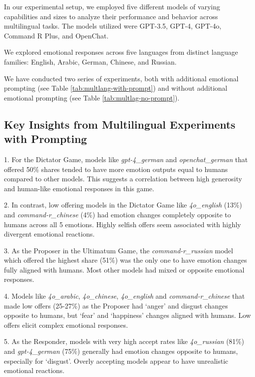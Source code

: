 \documentclass{article}
\begin{document}
In our experimental setup, we employed five different models of varying capabilities and sizes to analyze their performance and behavior across multilingual tasks. The models utilized were GPT-3.5, GPT-4, GPT-4o, Command R Plus, and OpenChat.

We explored emotional responses across five languages from distinct language families: English, Arabic, German, Chinese, and Russian.

We have conducted two series of experiments, both with additional emotional prompting (see Table \ref{tab:multlang-with-prompt}) and without additional emotional prompting (see Table \ref{tab:multlag-no-prompt}).

\subsection*{Key Insights from Multilingual Experiments with Prompting} \label{app: key_insig_with}

1. For the Dictator Game, models like \textit{gpt-4\_german} and \textit{openchat\_german} that offered 50\% shares tended to have more emotion outputs equal to humans compared to other models. This suggests a correlation between high generosity and human-like emotional responses in this game.

2. In contrast, low offering models in the Dictator Game like \textit{4o\_english} (13\%) and \textit{command-r\_chinese} (4\%) had emotion changes completely opposite to humans across all 5 emotions. Highly selfish offers seem associated with highly divergent emotional reactions.

3. As the Proposer in the Ultimatum Game, the \textit{command-r\_russian} model which offered the highest share (51\%) was the only one to have emotion changes fully aligned with humans. Most other models had mixed or opposite emotional responses.

4. Models like \textit{4o\_arabic}, \textit{4o\_chinese}, \textit{4o\_english} and \textit{command-r\_chinese} that made low offers (25-27\%) as the Proposer had `anger' and disgust changes opposite to humans, but `fear' and `happiness' changes aligned with humans. Low offers elicit complex emotional responses.

5. As the Responder, models with very high accept rates like \textit{4o\_russian} (81\%) and \textit{gpt-4\_german} (75\%) generally had emotion changes opposite to humans, especially for `disgust'. Overly accepting models appear to have unrealistic emotional reactions.
\end{document}
